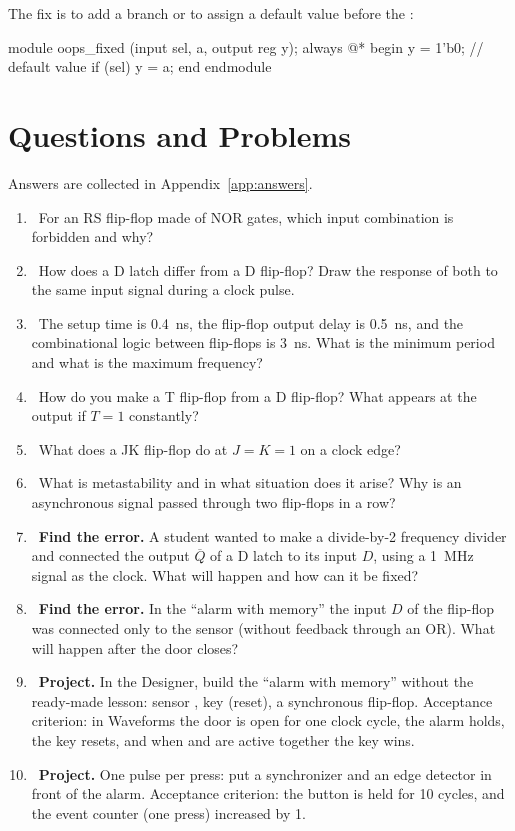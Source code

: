 The fix is to add a branch or to assign a default value before the :

\begin{vcode}
module oops_fixed (input sel, a, output reg y);
    always @* begin
        y = 1'b0;            // default value
        if (sel) y = a;
    end
endmodule
\end{vcode}

\section{Questions and Problems}
\label{sec:tasks-ff}

Answers are collected in Appendix~\ref{app:answers}.

\begin{taskbox}
\begin{enumerate}
  \item {}~For an RS flip-flop made of NOR gates, which input combination is forbidden and why?
  \item {}~How does a D latch differ from a D flip-flop? Draw the response of both to the same input signal during a clock pulse.
  \item {}~The setup time is 0.4~ns, the flip-flop output delay is 0.5~ns, and the combinational logic between flip-flops is 3~ns. What is the minimum period and what is the maximum frequency?
  \item {}~How do you make a T flip-flop from a D flip-flop? What appears at the output if $T=1$ constantly?
  \item {}~What does a JK flip-flop do at $J=K=1$ on a clock edge?
  \item {}~What is metastability and in what situation does it arise? Why is an asynchronous signal passed through two flip-flops in a row?
  \item {}~\textbf{Find the error.} A student wanted to make a divide-by-2 frequency divider and connected the output $\overline{Q}$ of a D latch to its input $D$, using a 1~MHz signal as the clock. What will happen and how can it be fixed?
  \item {}~\textbf{Find the error.} In the ``alarm with memory'' the input $D$ of the flip-flop was connected only to the sensor (without feedback through an OR). What will happen after the door closes?
  \item {}~\textbf{Project.} In the Designer, build the ``alarm with memory'' without the ready-made lesson: sensor , key  (reset), a synchronous flip-flop. Acceptance criterion: in Waveforms the door is open for one clock cycle, the alarm holds, the key resets, and when  and  are active together the key wins.
  \item {}~\textbf{Project.} One pulse per press: put a synchronizer and an edge detector in front of the alarm. Acceptance criterion: the button is held for 10 cycles, and the event counter (one press) increased by 1.
\end{enumerate}
\end{taskbox}

